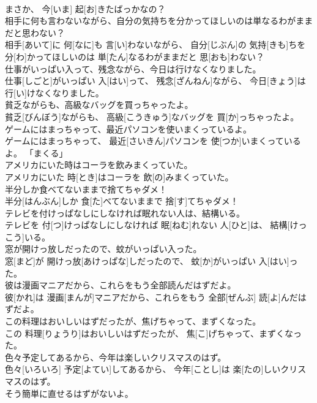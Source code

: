\documentclass[8pt]{extreport}
\begin{document}
\begin{CJK}{UTF8}{min}
\\	まさか、 今[いま] 起[お]きたばっかなの？	
\\	相手に何も言わないながら、自分の気持ちを分かってほしいのは単なるわがままだと思わない？	
\\	相手[あいて]に 何[なに]も 言[い]わないながら、 自分[じぶん]の 気持[きも]ちを 分[わ]かってほしいのは 単[たん]なるわがままだと 思[おも]わない？	
\\	仕事がいっぱい入って、残念ながら、今日は行けなくなりました。	
\\	仕事[しごと]がいっぱい 入[はい]って、 残念[ざんねん]ながら、 今日[きょう]は 行[い]けなくなりました。	
\\	貧乏ながらも、高級なバッグを買っちゃったよ。	
\\	貧乏[びんぼう]ながらも、 高級[こうきゅう]なバッグを 買[か]っちゃったよ。	
\\	ゲームにはまっちゃって、最近パソコンを使いまくっているよ。	
\\	ゲームにはまっちゃって、 最近[さいきん]パソコンを 使[つか]いまくっているよ。	「まくる」 
\\	アメリカにいた時はコーラを飲みまくっていた。	
\\	アメリカにいた 時[とき]はコーラを 飲[の]みまくっていた。	
\\	半分しか食べてないままで捨てちゃダメ！	
\\	半分[はんぶん]しか 食[た]べてないままで 捨[す]てちゃダメ！	
\\	テレビを付けっぱなしにしなければ眠れない人は、結構いる。	
\\	テレビを 付[つ]けっぱなしにしなければ 眠[ねむ]れない 人[ひと]は、 結構[けっこう]いる。	
\\	窓が開けっ放しだったので、蚊がいっぱい入った。	
\\	窓[まど]が 開けっ放[あけっぱな]しだったので、 蚊[か]がいっぱい 入[はい]った。	
\\	彼は漫画マニアだから、これらをもう全部読んだはずだよ。	
\\	彼[かれ]は 漫画[まんが]マニアだから、これらをもう 全部[ぜんぶ] 読[よ]んだはずだよ。	
\\	この料理はおいしいはずだったが、焦げちゃって、まずくなった。	
\\	この 料理[りょうり]はおいしいはずだったが、 焦[こ]げちゃって、まずくなった。	
\\	色々予定してあるから、今年は楽しいクリスマスのはず。	
\\	色々[いろいろ] 予定[よてい]してあるから、 今年[ことし]は 楽[たの]しいクリスマスのはず。	
\\	そう簡単に直せるはずがないよ。	

\end{CJK}
\end{document}

